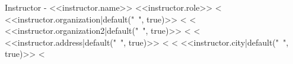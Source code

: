 \documentclass[a4paper,10pt]{article}
\begin{document}
\begin{multicols}{3}
 \begin{minipage}[b][4cm][b]{0.4\textwidth}
   
  
 \end{minipage}%
 \columnbreak
 \begin{minipage}[b][4cm][b]{0.2\textwidth}
 \end{minipage}%
 \columnbreak
 \begin{flushright}
 \raggedleft
 \begin{minipage}[b][4cm][b]{0.4\textwidth}
     Instructor - <<instructor.name>>\newline
     \footnotesize{<<instructor.role>>}\newline
  \phantom{H}
  <%
     <<instructor.organization|default("~", true)>> \newline
  <%
  <%
    <<instructor.organization2|default("~", true)>> \newline
  <%
  <%
     <<instructor.address|default("~", true)>>\newline
  <%
  <%
     <<instructor.city|default("~", true)>>\newline
  <%
 \end{minipage}
 \end{flushright}

\end{multicols}
\end{document}
